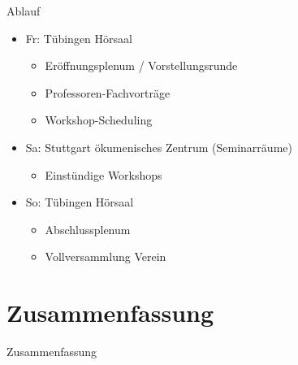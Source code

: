 {%
\begin{frame}{Ablauf}
  \begin{itemize}
  \item Fr: Tübingen Hörsaal
    \begin{itemize}
    \item Eröffnungsplenum / Vorstellungsrunde
    \item Professoren-Fachvorträge
    \item Workshop-Scheduling
    \end{itemize}
  \item Sa: Stuttgart ökumenisches Zentrum (Seminarräume)
    \begin{itemize}
    \item Einstündige Workshops
    \end{itemize}
  \item So: Tübingen Hörsaal
    \begin{itemize}
    \item Abschlussplenum
    \item Vollversammlung Verein
    \end{itemize}
  \end{itemize} 
\end{frame}
}
\begin{frame}
  
\end{frame}
\section{Zusammenfassung}

\begin{frame}{Zusammenfassung}
\end{frame}